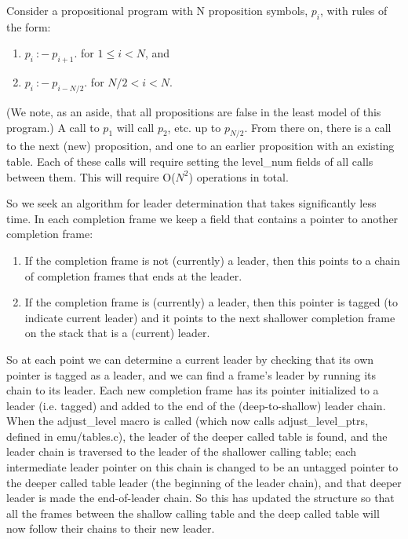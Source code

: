 Consider a propositional program with N proposition symbols, $p_i$,
with rules of the form:
\begin{enumerate}
\item $p_i~:-~p_{i+1}$. for $1 \leq i < N$, and
\item $p_i~:-~p_{i-N/2}$. for $N/2 < i < N$.
\end{enumerate}
(We note, as an aside, that all propositions are false in the least
model of this program.)  A call to $p_1$ will call $p_2$, etc. up to
$p_{N/2}$. From there on, there is a call to the next (new)
proposition, and one to an earlier proposition with an existing table.
Each of these calls will require setting the level\_num fields of all
calls between them.  This will require O($N^2$) operations in total.

So we seek an algorithm for leader determination that takes
significantly less time.  In each completion frame we keep a field
that contains a pointer to another completion frame:
\begin{enumerate}
\item If the completion frame is not (currently) a leader, then this
  points to a chain of completion frames that ends at the leader.
\item If the completion frame is (currently) a leader, then this
  pointer is tagged (to indicate current leader) and it points to the
  next shallower completion frame on the stack that is a (current)
  leader.
\end{enumerate}
So at each point we can determine a current leader by checking that
its own pointer is tagged as a leader, and we can find a frame's
leader by running its chain to its leader.  Each new completion frame
has its pointer initialized to a leader (i.e. tagged) and added to the
end of the (deep-to-shallow) leader chain.  When the adjust\_level
macro is called (which now calls adjust\_level\_ptrs, defined in
emu/tables.c), the leader of the deeper called table is found, and the
leader chain is traversed to the leader of the shallower calling
table; each intermediate leader pointer on this chain is changed to be
an untagged pointer to the deeper called table leader (the beginning
of the leader chain), and that deeper leader is made the end-of-leader
chain.  So this has updated the structure so that all the frames
between the shallow calling table and the deep called table will now
follow their chains to their new leader.

